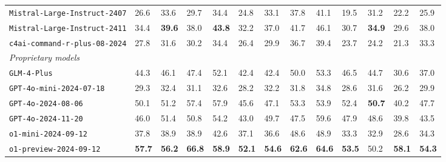 \begin{table*}[t]
{\begin{tabular}{p{5.7cm}|m{0.7cm}m{0.7cm}|m{0.7cm}m{0.7cm}|m{0.7cm}m{0.7cm}|m{0.7cm}m{0.7cm}|m{0.7cm}m{0.7cm}|m{0.7cm}m{0.7cm}}
\texttt{Mistral-Large-Instruct-2407} & 26.6 & \cellcolor{mygray}33.6 & 29.7 & \cellcolor{mygray}34.4 & 24.8 & \cellcolor{mygray}33.1 & 37.8 & \cellcolor{mygray}41.1 & 19.5 & \cellcolor{mygray}31.2 & 22.2 & \cellcolor{mygray}25.9 \\
\texttt{Mistral-Large-Instruct-2411} & 34.4 & \cellcolor{mygray}\textbf{39.6} & 38.0 & \cellcolor{mygray}\textbf{43.8} & 32.2 & \cellcolor{mygray}37.0 & 41.7 & \cellcolor{mygray}46.1 & 30.7 & \cellcolor{mygray}\textbf{34.9} & 29.6 & \cellcolor{mygray}38.0 \\
\texttt{c4ai-command-r-plus-08-2024} & 27.8 & \cellcolor{mygray}31.6 & 30.2 & \cellcolor{mygray}34.4 & 26.4 & \cellcolor{mygray}29.9 & 36.7 & \cellcolor{mygray}39.4 & 23.7 & \cellcolor{mygray}24.2 & 21.3 & \cellcolor{mygray}33.3 \\ 
\midrule
\multicolumn{13}{l}{\emph{Proprietary models}} \\
\texttt{GLM-4-Plus} & 44.3 & \cellcolor{mygray}46.1 & 47.4 & \cellcolor{mygray}52.1 & 42.4 & \cellcolor{mygray}42.4 & 50.0 & \cellcolor{mygray}53.3 & 46.5 & \cellcolor{mygray}44.7 & 30.6 & \cellcolor{mygray}37.0 \\
\texttt{GPT-4o-mini-2024-07-18} & 29.3 & \cellcolor{mygray}32.4 & 31.1 & \cellcolor{mygray}32.6 & 28.2 & \cellcolor{mygray}32.2 & 31.8 & \cellcolor{mygray}34.8 & 28.6 & \cellcolor{mygray}31.6 & 26.2 & \cellcolor{mygray}29.9 \\
\texttt{GPT-4o-2024-08-06} & 50.1 & \cellcolor{mygray}51.2 & 57.4 & \cellcolor{mygray}57.9 & 45.6 & \cellcolor{mygray}47.1 & 53.3 & \cellcolor{mygray}53.9 & 52.4 & \cellcolor{mygray}\textbf{50.7} & 40.2 & \cellcolor{mygray}47.7 \\
\texttt{GPT-4o-2024-11-20} & 46.0 & \cellcolor{mygray}51.4 & 50.8 & \cellcolor{mygray}54.2 & 43.0 & \cellcolor{mygray}49.7 & 47.5 & \cellcolor{mygray}59.6 & 47.9 & \cellcolor{mygray}48.6 & 39.8 & \cellcolor{mygray}43.5 \\
\texttt{o1-mini-2024-09-12} & 37.8 & \cellcolor{mygray}38.9 & 38.9 & \cellcolor{mygray}42.6 & 37.1 & \cellcolor{mygray}36.6 & 48.6 & \cellcolor{mygray}48.9 & 33.3 & \cellcolor{mygray}32.9 & 28.6 & \cellcolor{mygray}34.3 \\
\texttt{o1-preview-2024-09-12} & \textbf{57.7} & \cellcolor{mygray}\textbf{56.2} & \textbf{66.8} & \cellcolor{mygray}\textbf{58.9} & \textbf{52.1} & \cellcolor{mygray}\textbf{54.6} & \textbf{62.6} & \cellcolor{mygray}\textbf{64.6} & \textbf{53.5} & \cellcolor{mygray}50.2 & \textbf{58.1} & \cellcolor{mygray}\textbf{54.3} \\

\end{tabular}}
\end{table*}
